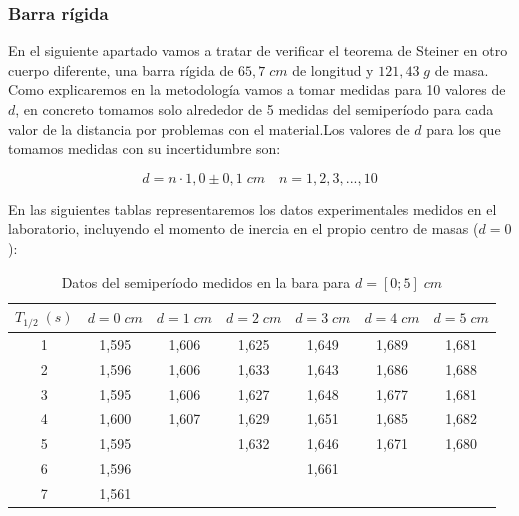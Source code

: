 \documentclass[a4paper,12pt,titlepage]{article}
\begin{document}
\subsubsection{Barra rígida}

En el siguiente apartado vamos a tratar de verificar el teorema de Steiner en otro cuerpo diferente, una barra rígida de $65,7 \; cm$ de longitud y $121,43 \; g$ de masa. Como explicaremos en la metodología vamos a tomar medidas para 10 valores de $d$, en concreto tomamos solo alrededor de 5 medidas del semiperíodo para cada valor de la distancia por problemas con el material.Los valores de $d$ para los que tomamos medidas con su incertidumbre son:

\begin{equation}
    d = n\cdot 1,0 \pm 0,1 \; cm \quad n = 1,2,3,...,10
\end{equation}

En las siguientes tablas representaremos los datos experimentales medidos en el laboratorio, incluyendo el momento de inercia en el propio centro de masas ($d=0$):

\begin{table}[h!]
    \centering
    \begin{tabular}{|c|c|c|c|c|c|c|}
    \hline
    $T_{1/2} \; (s)$ & $d=0 \;cm$& $d=1 \;cm$ & $d=2 \;cm$ & $d=3 \;cm$ & $d=4 \;cm$ & $d=5 \;cm$ \\ \hline
    1 & 1,595 & 1,606 & 1,625 & 1,649 & 1,689 & 1,681 \\ \hline
    2 & 1,596 & 1,606 & 1,633 & 1,643 & 1,686 & 1,688 \\ \hline
    3 & 1,595 & 1,606 & 1,627 & 1,648 & 1,677 & 1,681 \\ \hline
    4 & 1,600   & 1,607 & 1,629 & 1,651 & 1,685 & 1,682 \\ \hline
    5 & 1,595 &       & 1,632 & 1,646 & 1,671 & 1,680  \\ \hline
    6 & 1,596 &       &       & 1,661 &       &       \\ \hline
    7 & 1,561 &       &       &       &       &       \\ \hline
    \end{tabular}
    \caption{Datos del semiperíodo medidos en la bara para $d=[0;5] \; cm$}
    \label{Datos barra 1}
\end{table}
\end{document}
